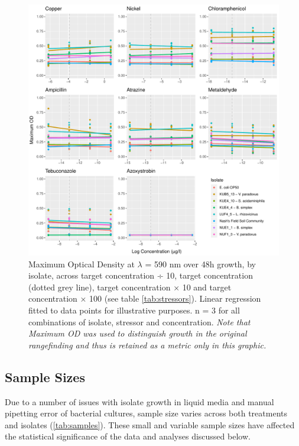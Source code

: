 \documentclass[10pt]{article}
\begin{document}
\begin{figure}[H]
    \centering
    \includegraphics[width = \textwidth]{Scripts/Results/Bug_Rangefinding/plots_rangefinding.pdf}
    \caption{Maximum Optical Density at $\lambda$ = 590 nm over 48h growth, by isolate, across target concentration ÷ 10, target concentration (dotted grey line), target concentration × 10 and target concentration × 100 (see table \ref{tab:stressors}). Linear regression fitted to data points for illustrative purposes. n = 3 for all combinations of isolate, stressor and concentration. \textit{Note that Maximum OD was used to distinguish growth in the original rangefinding and thus is retained as a metric only in this graphic.}}
    \label{fig:rangefinding}
\end{figure}

\subsection{Sample Sizes}
\label{S:3:2}

Due to a number of issues with isolate growth in liquid media and manual pipetting error of bacterial cultures, sample size varies across both treatments and isolates (\cref{tab:samples}). These small and variable sample sizes have affected the statistical significance of the data and analyses discussed below.
\end{document}
